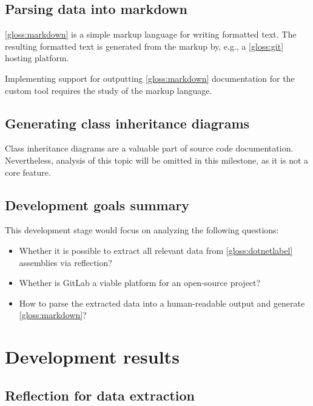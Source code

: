 \subsection{Parsing data into markdown}
\ref{gloss:markdown} is a simple markup language for writing formatted text. The resulting formatted text is generated from the markup by, e.g., a \ref{gloss:git} hosting platform.

Implementing support for outputting \ref{gloss:markdown} documentation for the custom tool requires the study of the markup language.

\subsection{Generating class inheritance diagrams}
Class inheritance diagrams are a valuable part of source code documentation. Nevertheless, analysis of this topic will be omitted in this milestone, as it is not a core feature.

\subsection{Development goals summary}
This development stage would focus on analyzing the following questions:
\begin{itemize}
    \item Whether it is possible to extract all relevant data from \ref{gloss:dotnetlabel} assemblies via reflection?
    \item Whether is GitLab a viable platform for an open-source project?
    \item How to parse the extracted data into a human-readable output and generate \ref{gloss:markdown}?
\end{itemize}

\section{Development results}

\subsection{Reflection for data extraction}

